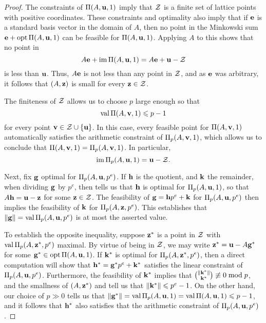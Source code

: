 \documentclass[11pt]{amsart}
\begin{document}
\begin{proof}
   The constraints of $\Pi(A, \mathbf{u}, 1)$ imply that $\mathcal{Z}$ is a finite set of lattice points with positive coordinates.   These constraints and optimality also imply that if $\mathbf{e}$ is a standard basis vector in the domain of $A$, then no point in the Minkowski sum $\mathbf{e} + \operatorname{opt} \Pi(A, \mathbf{u}, 1)$ can be feasible for $\Pi(A, \mathbf{u}, 1)$.  Applying $A$ to this shows that no point in 
\[ A \mathbf{e} + \operatorname{im} \Pi(A, \mathbf{u}, 1) = A \mathbf{e} + \mathbf{u} - \mathcal{Z} \] 
is less than $\mathbf{u}$.  Thus, $A \mathbf{e}$ is not less than any point in $\mathcal{Z}$, and as $\mathbf{e}$ was arbitrary, it follows that $(A, \mathbf{z})$ is small for every $\mathbf{z} \in \mathcal{Z}$.

The finiteness of $\mathcal{Z}$ allows us to choose $p$ large enough so that \[ \operatorname{val} \Pi(A, \mathbf{v}, 1) \leqslant p -1 \] for every point $\mathbf{v} \in \mathcal{Z} \cup \{ \mathbf{u} \}$.  In this case, every feasible point for $\Pi(A, \mathbf{v}, 1)$  automatically satisfies the arithmetic constraint of $\Pi_p(A, \mathbf{v}, 1)$, which allows us to conclude that $\Pi(A, \mathbf{v}, 1) = \Pi_p(A, \mathbf{v}, 1)$.  In particular,
\[ \operatorname{im} \Pi_p(A, \mathbf{u}, 1) =\mathbf{u} - \mathcal{Z}. \] 

Next, fix $\mathbf{g}$ optimal for $\Pi_p(A, \mathbf{u}, p^e)$.  If $\mathbf{h}$ is the quotient, and $\mathbf{k}$ the remainder, when dividing $\mathbf{g}$ by $p^e$, then  tells us that $\mathbf{h}$ is optimal for $\Pi_p(A, \mathbf{u}, 1)$, so that $A \mathbf{h} = \mathbf{u}-\mathbf{z}$ for some $\mathbf{z} \in \mathcal{Z}$.  The feasibility of $\mathbf{g}=\mathbf{h}p^e + \mathbf{k}$ for $\Pi_p(A, \mathbf{u}, p^e)$ then implies the feasibility of $\mathbf{k}$ for $\Pi_p(A, \mathbf{z}, p^e)$.  This establishes that $\| \mathbf{g} \| = \operatorname{val} \Pi_p(A, \mathbf{u}, p^e)$ is at most the asserted value.

To establish the opposite inequality, suppose $\mathbf{z}^{\ast}$ is a point in $\mathcal{Z}$ with $\operatorname{val} \Pi_p(A, \mathbf{z}^{\ast}, p^e)$ maximal.  By virtue of being in $\mathcal{Z}$, we may write $\mathbf{z}^{\ast} = \mathbf{u} - A \mathbf{g}^{\ast}$ for some $\mathbf{g}^{\ast} \in \operatorname{opt} \Pi(A, \mathbf{u}, 1)$.  If $\mathbf{k}^{\ast}$ is optimal for $\Pi_p(A, \mathbf{z}^{\ast}, p^e)$, then a direct computation will show that 
$\mathbf{h}^{\ast} = \mathbf{g}^{\ast} p^e + \mathbf{k}^{\ast}$ satisfies the linear constraint of  $\Pi_p(A, \mathbf{u}, p^e)$.  Furthermore, the feasibility of $\mathbf{k}^{\ast}$ implies that $\binom{\| \mathbf{k}^{\ast} \|}{\mathbf{k}^{\ast}} \not \equiv 0 \bmod p$, and the smallness of $(A, \mathbf{z}^{\ast})$ and  tell us that $\| \mathbf{k}^{\ast} \| \leqslant p^e-1$.  On the other hand, our choice of $p \gg 0$ tells us that $\| \mathbf{g}^{\ast} \| = \operatorname{val} \Pi_p(A, \mathbf{u}, 1) = \operatorname{val} \Pi(A, \mathbf{u}, 1) \leqslant p-1$, and it follows that $\mathbf{h}^{\ast}$ also satisfies that the arithmetic constraint of $\Pi_p(A, \mathbf{u}, p^e)$.
\end{proof}
\end{document}

